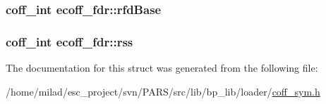 \label{structecoff__fdr_ad8716975111f78844557ad0c2e1da75c}
\hypertarget{structecoff__fdr_a24a42274fb666299d163bb9edf499557}{
\subsubsection[{rfdBase}]{\setlength{\rightskip}{0pt plus 5cm}coff\_\-int {\bf ecoff\_\-fdr::rfdBase}}}
\label{structecoff__fdr_a24a42274fb666299d163bb9edf499557}
\hypertarget{structecoff__fdr_a6a3dca809302b75535424ba06958ed4b}{
\subsubsection[{rss}]{\setlength{\rightskip}{0pt plus 5cm}coff\_\-int {\bf ecoff\_\-fdr::rss}}}
\label{structecoff__fdr_a6a3dca809302b75535424ba06958ed4b}


The documentation for this struct was generated from the following file:\begin{DoxyCompactItemize}
\item 
/home/milad/esc\_\-project/svn/PARS/src/lib/bp\_\-lib/loader/\hyperlink{coff__sym_8h}{coff\_\-sym.h}\end{DoxyCompactItemize}
